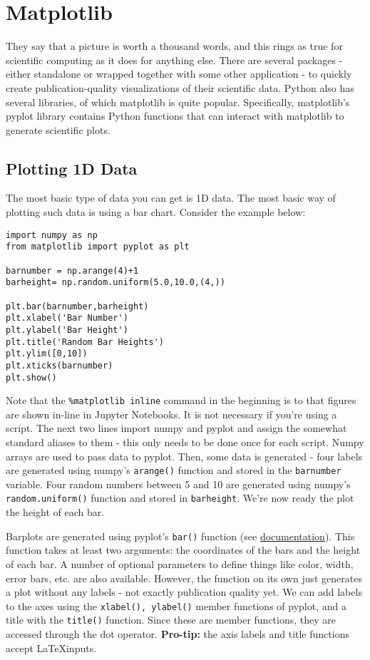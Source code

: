 \documentclass[12pt]{article}
\newcommand{\code}{\texttt}
\begin{document}
\newpage
\section{Matplotlib}
They say that a picture is worth a thousand words, and this rings as true for scientific computing as it does for anything else. There are several packages - either standalone or wrapped together with some other application - to quickly create publication-quality visualizations of their scientific data. Python also has several libraries, of which matplotlib is quite popular. Specifically, matplotlib's pyplot library contains Python functions that can interact with matplotlib to generate scientific plots. 

\subsection{Plotting 1D Data}
The most basic type of data you can get is 1D data. The most basic way of plotting such data is using a bar chart. Consider the example below:

\begin{lstlisting}[frame=single] 
%matplotlib inline
import numpy as np
from matplotlib import pyplot as plt

barnumber = np.arange(4)+1
barheight= np.random.uniform(5.0,10.0,(4,))

plt.bar(barnumber,barheight)
plt.xlabel('Bar Number')
plt.ylabel('Bar Height')
plt.title('Random Bar Heights')
plt.ylim([0,10])
plt.xticks(barnumber)
plt.show()
\end{lstlisting}

Note that the \code{\%matplotlib inline} command in the beginning is to that figures are shown in-line in Jupyter Notebooks. It is not necessary if you're using a script. The next two lines import numpy and pyplot and assign the somewhat standard aliases to them - this only needs to be done once for each script. Numpy arrays are used to pass data to pyplot. Then, some data is generated - four labels are generated using numpy's \code{arange()} function and stored in the \code{barnumber} variable. Four random numbers between 5 and 10 are generated using numpy's \code{random.uniform()} function and stored in \code{barheight}. We're now ready the plot the height of each bar.

Barplots are generated using pyplot's \code{bar()} function (see \href{https://matplotlib.org/api/_as_gen/matplotlib.pyplot.bar.html}{documentation}). This function takes at least two arguments: the coordinates of the bars and the height of each bar. A number of optional parameters to define things like color, width, error bars, etc. are also available. However, the function on its own just generates a plot without any labels - not exactly publication quality yet. We can add labels to the axes using the \code{xlabel(), ylabel()} member functions of pyplot, and a title with the \code{title()} function. Since these are member functions, they are accessed through the dot operator. \textbf{Pro-tip:} the axis labels and title functions accept \LaTeX inputs.
\end{document}
